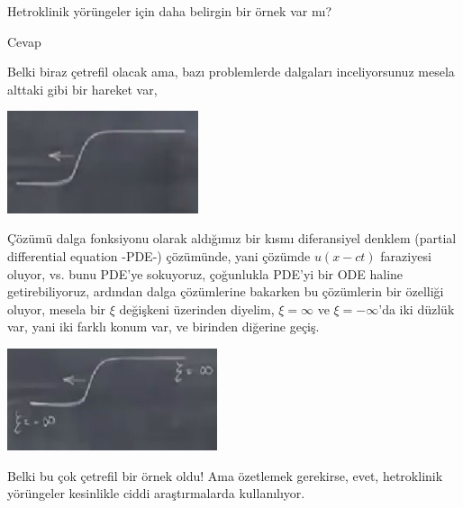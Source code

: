 \documentclass[12pt,fleqn]{article}\usepackage{../../common}
\begin{document}
Hetroklinik yörüngeler için daha belirgin bir örnek var mı?

Cevap

Belki biraz çetrefil olacak ama, bazı problemlerde dalgaları inceliyorsunuz
mesela alttaki gibi bir hareket var,

\includegraphics[height=3cm]{07_19.png}

Çözümü dalga fonksiyonu olarak aldığımız bir kısmı diferansiyel denklem (partial
differential equation -PDE-) çözümünde, yani çözümde $u(x-ct)$ faraziyesi
oluyor, vs. bunu PDE'ye sokuyoruz, çoğunlukla PDE'yi bir ODE haline
getirebiliyoruz, ardından dalga çözümlerine bakarken bu çözümlerin bir özelliği
oluyor, mesela bir $\xi$ değişkeni üzerinden diyelim, $\xi = \infty$ ve $\xi =
-\infty$'da iki düzlük var, yani iki farklı konum var, ve birinden diğerine
geçiş.

\includegraphics[height=3cm]{07_20.png}

Belki bu çok çetrefil bir örnek oldu! Ama özetlemek gerekirse, evet, hetroklinik
yörüngeler kesinlikle ciddi araştırmalarda kullanılıyor.
\end{document}
